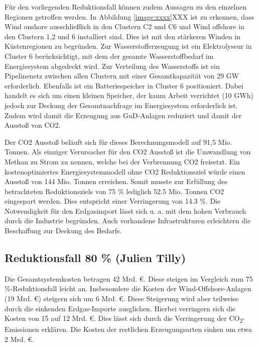 Für den vorliegenden Reduktionsfall können zudem Aussagen zu den einzelnen Regionen getroffen werden. In Abbildung \ref{image:xxxx}XXX ist zu erkennen, dass Wind onshore ausschließlich in den Clustern C2 und C6 und Wind offshore in den Clustern 1,2 und 6 installiert sind. Dies ist mit den stärkeren Winden in Küstenregionen zu begründen. Zur Wasserstofferzeugung ist ein Elektrolyseur in Cluster 6 berücksichtigt, mit dem der gesamte Wasserstoffbedarf im Energiesystem abgedeckt wird. Zur Verteilung des Wasserstoffs ist ein Pipelinenetz zwischen allen Clustern mit einer Gesamtkapazität von 29 GW erforderlich. Ebenfalls ist ein Batteriespeicher in Cluster 6 positioniert. Dabei handelt es sich um einen kleinen Speicher, der kaum Arbeit verrichtet (10 GWh) jedoch zur Deckung der Gesamtnachfrage im Energiesystem erforderlich ist. Zudem wird damit die Erzeugung aus GuD-Anlagen reduziert und damit der Ausstoß von CO2. 


Der CO2 Ausstoß beläuft sich für dieses Berechnungsmodell auf 91,5 Mio. Tonnen. Als einziger Verursacher für den CO2 Ausstoß ist die Umwandlung von Methan zu Strom zu nennen, welche bei der Verbrennung CO2 freisetzt. Ein kostenoptimiertes Energiesystemmodell ohne CO2 Reduktionsziel würde einen Ausstoß von 144 Mio. Tonnen erreichen. Somit musste zur Erfüllung des betrachteten Reduktionsziels von 75 \% lediglich 52.5 Mio. Tonnen CO2 eingespart werden. Dies entspricht einer Verringerung von 14.3 \%. Die Notwendigkeit für den Erdgasimport lässt sich u. a. mit dem hohen Verbrauch durch die Industrie begründen. Auch vorhandene Infrastrukturen erleichtern die Beschaffung zur Deckung des Bedarfs. 


\newpage
\subsection{Reduktionsfall 80 \% (Julien Tilly)}
Die Gesamtsystemkosten betragen 42 Mrd. €. Diese steigen im Vergleich zum 75 \%-Reduktionsfall leicht an. Insbesondere die Kosten der Wind-Offshore-Anlagen (19 Mrd. €) steigern sich um 6 Mrd. €. Diese Steigerung wird aber teilweise durch die sinkenden Erdgas-Importe ausglichen. Hierbei verringern sich die Kosten von 15 auf 12 Mrd. €. Dies lässt sich durch die Verringerung der CO\textsubscript{2}-Emissionen erklären. Die Kosten der restlichen Erzeugungsarten sinken um etwa 2 Mrd. €.

